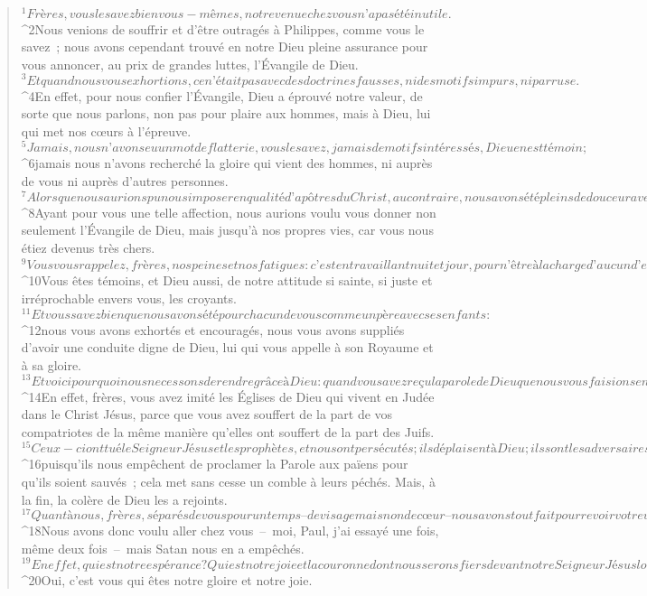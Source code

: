          
      \bchapter{}
      \begin{verse}
${}^{1}Frères, vous le savez bien vous-mêmes, notre venue chez vous n’a pas été inutile. 
${}^{2}Nous venions de souffrir et d’être outragés à Philippes, comme vous le savez ; nous avons cependant trouvé en notre Dieu pleine assurance pour vous annoncer, au prix de grandes luttes, l’Évangile de Dieu. 
${}^{3}Et quand nous vous exhortions, ce n’était pas avec des doctrines fausses, ni des motifs impurs, ni par ruse. 
${}^{4}En effet, pour nous confier l’Évangile, Dieu a éprouvé notre valeur, de sorte que nous parlons, non pas pour plaire aux hommes, mais à Dieu, lui qui met nos cœurs à l’épreuve. 
${}^{5}Jamais, nous n’avons eu un mot de flatterie, vous le savez, jamais de motifs intéressés, Dieu en est témoin ; 
${}^{6}jamais nous n’avons recherché la gloire qui vient des hommes, ni auprès de vous ni auprès d’autres personnes. 
${}^{7}Alors que nous aurions pu nous imposer en qualité d’apôtres du Christ, au contraire, nous avons été pleins de douceur avec vous, comme une mère qui entoure de soins ses nourrissons. 
${}^{8}Ayant pour vous une telle affection, nous aurions voulu vous donner non seulement l’Évangile de Dieu, mais jusqu’à nos propres vies, car vous nous étiez devenus très chers. 
${}^{9}Vous vous rappelez, frères, nos peines et nos fatigues : c’est en travaillant nuit et jour, pour n’être à la charge d’aucun d’entre vous, que nous vous avons annoncé l’Évangile de Dieu. 
${}^{10}Vous êtes témoins, et Dieu aussi, de notre attitude si sainte, si juste et irréprochable envers vous, les croyants. 
${}^{11}Et vous savez bien que nous avons été pour chacun de vous comme un père avec ses enfants : 
${}^{12}nous vous avons exhortés et encouragés, nous vous avons suppliés d’avoir une conduite digne de Dieu, lui qui vous appelle à son Royaume et à sa gloire.
${}^{13}Et voici pourquoi nous ne cessons de rendre grâce à Dieu : quand vous avez reçu la parole de Dieu que nous vous faisions entendre, vous l’avez accueillie pour ce qu’elle est réellement, non pas une parole d’hommes, mais la parole de Dieu qui est à l’œuvre en vous, les croyants. 
${}^{14}En effet, frères, vous avez imité les Églises de Dieu qui vivent en Judée dans le Christ Jésus, parce que vous avez souffert de la part de vos compatriotes de la même manière qu’elles ont souffert de la part des Juifs. 
${}^{15}Ceux-ci ont tué le Seigneur Jésus et les prophètes, et nous ont persécutés ; ils déplaisent à Dieu ; ils sont les adversaires de tous les hommes, 
${}^{16}puisqu’ils nous empêchent de proclamer la Parole aux païens pour qu’ils soient sauvés ; cela met sans cesse un comble à leurs péchés. Mais, à la fin, la colère de Dieu les a rejoints.
${}^{17}Quant à nous, frères, séparés de vous pour un temps – de visage mais non de cœur – nous avons tout fait pour revoir votre visage, tellement nous en avions le désir. 
${}^{18}Nous avons donc voulu aller chez vous – moi, Paul, j’ai essayé une fois, même deux fois – mais Satan nous en a empêchés. 
${}^{19}En effet, qui est notre espérance ? Qui est notre joie et la couronne dont nous serons fiers devant notre Seigneur Jésus lors de sa venue ? N’est-ce pas vous ? 
${}^{20}Oui, c’est vous qui êtes notre gloire et notre joie.
      

\end{verse}
